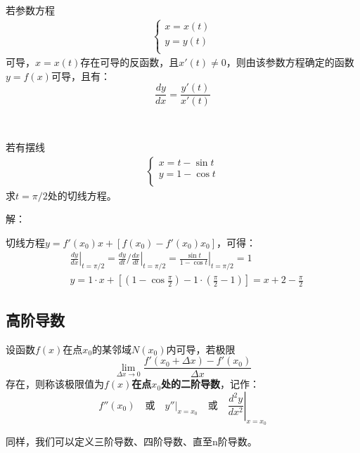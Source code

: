 \begin{theorem}[参数函数求导定理]
若参数方程
\begin{align*}
\begin{cases}
	x=x\left( t \right)\\
	y=y\left( t \right)\\
\end{cases}
\end{align*}
可导，$x=x\left( t \right) $存在可导的反函数，且$x'\left( t \right) \ne 0$，则由该参数方程确定的函数$y=f\left( x \right) $可导，且有：
\[
\frac{dy}{dx}=\frac{y'\left( t \right)}{x'\left( t \right)}
\]
\end{theorem}

~

\begin{example}
若有摆线
\begin{align*}
\begin{cases}
	x=t-\sin t\\
	y=1-\cos t\\
\end{cases}
\end{align*}
求$t=\pi /2$处的切线方程。
\end{example}

解：

切线方程$y=f'\left( x_0 \right) x+\left[ f\left( x_0 \right) -f'\left( x_0 \right) x_0 \right] $，可得：
\begin{align*}
&\left. \frac{dy}{dx} \right|_{t=\pi /2}=\left. \frac{dy}{dt}/\frac{dx}{dt} \right|_{t=\pi /2}=\left. \frac{\sin t}{1-\cos t} \right|_{t=\pi /2}=1 \\
&y=1\cdot x+\left[ \left( 1-\cos \frac{\pi}{2} \right) -1\cdot \left( \frac{\pi}{2}-1 \right) \right] =x+2-\frac{\pi}{2}
\end{align*}

\subsection{高阶导数}

\begin{definition}[二阶导数]
设函数$f\left( x \right) $在点$x_0$的某邻域$N\left( x_0 \right) $内可导，若极限
\[
\underset{\Delta x\rightarrow 0}{\lim}\frac{f'\left( x_0+\Delta x \right) -f'\left( x_0 \right)}{\Delta x}
\]
存在，则称该极限值为{\bf $f\left( x \right) $在点$x_0$处的二阶导数}，记作：
\[
f''\left( x_0 \right) \quad \text{或} \quad \left. y'' \right|_{x=x_0} \quad \text{或} \quad \left. \frac{d^2y}{dx^2} \right|_{x=x_0}
\]
\end{definition}

同样，我们可以定义三阶导数、四阶导数、直至n阶导数。




